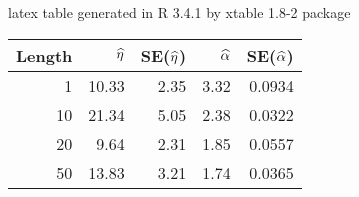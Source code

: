 
 latex table generated in R 3.4.1 by xtable 1.8-2 package
\begin{table}[ht]
\centering
\begin{tabular}{rrrrr}
  \hline
Length & $\widehat{\eta}$ & SE($\widehat{\eta}$) & $\widehat{\alpha}$ & SE($\widehat{\alpha}$) \\ 
  \hline
1 & 10.33 & 2.35 & 3.32 & 0.0934 \\ 
  10 & 21.34 & 5.05 & 2.38 & 0.0322 \\ 
  20 & 9.64 & 2.31 & 1.85 & 0.0557 \\ 
  50 & 13.83 & 3.21 & 1.74 & 0.0365 \\ 
   \hline
\end{tabular}
\end{table}
